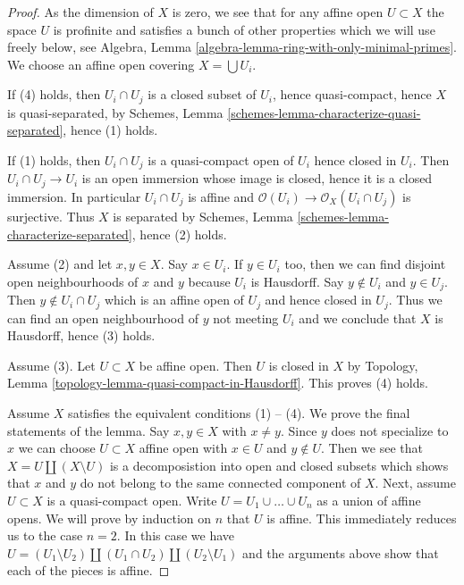 \begin{proof}
As the dimension of $X$ is zero, we see that for any affine open
$U \subset X$ the space $U$ is profinite and satisfies
a bunch of other properties which we will use freely below, see
Algebra, Lemma \ref{algebra-lemma-ring-with-only-minimal-primes}.
We choose an affine open covering $X = \bigcup U_i$.

\medskip\noindent
If (4) holds, then $U_i \cap U_j$ is a closed subset of
$U_i$, hence quasi-compact, hence $X$ is quasi-separated,
by Schemes, Lemma \ref{schemes-lemma-characterize-quasi-separated},
hence (1) holds.

\medskip\noindent
If (1) holds, then $U_i \cap U_j$ is a quasi-compact open
of $U_i$ hence closed in $U_i$. Then $U_i \cap U_j \to U_i$
is an open immersion whose image is closed, hence it is a
closed immersion. In particular $U_i \cap U_j$ is affine
and $\mathcal{O}(U_i) \to \mathcal{O}_X(U_i \cap U_j)$ is surjective.
Thus $X$ is separated
by Schemes, Lemma \ref{schemes-lemma-characterize-separated},
hence (2) holds.

\medskip\noindent
Assume (2) and let $x, y \in X$. Say $x \in U_i$. If $y \in U_i$
too, then we can find disjoint open neighbourhoods of $x$ and $y$
because $U_i$ is Hausdorff. Say $y \not \in U_i$ and $y \in U_j$.
Then $y \not \in U_i \cap U_j$ which is an affine open of $U_j$
and hence closed in $U_j$. Thus we can find an open neighbourhood
of $y$ not meeting $U_i$ and we conclude that $X$ is Hausdorff,
hence (3) holds.

\medskip\noindent
Assume (3). Let $U \subset X$ be affine open.
Then $U$ is closed in $X$ by Topology, Lemma
\ref{topology-lemma-quasi-compact-in-Hausdorff}.
This proves (4) holds.

\medskip\noindent
Assume $X$ satisfies the equivalent conditions (1) -- (4).
We prove the final statements of the lemma. Say $x, y \in X$
with $x \not = y$. Since $y$ does not specialize to $x$ we can
choose $U \subset X$ affine open with $x \in U$ and $y \not \in U$.
Then we see that $X = U \amalg (X \setminus U)$ is a decomposistion
into open and closed subsets which shows that $x$ and $y$ do not belong
to the same connected component of $X$. Next, assume $U \subset X$
is a quasi-compact open. Write $U = U_1 \cup \ldots \cup U_n$ as a union
of affine opens. We will prove by induction on $n$ that $U$ is affine.
This immediately reduces us to the case $n = 2$. In this case we have
$U = (U_1 \setminus U_2) \amalg (U_1 \cap U_2) \amalg (U_2 \setminus U_1)$
and the arguments above show that each of the pieces is affine.
\end{proof}

